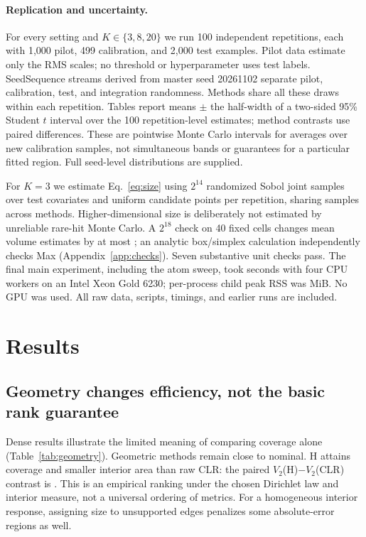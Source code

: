 \documentclass{article}
\begin{document}
\paragraph{Replication and uncertainty.}
For every setting and $K\in\{3,8,20\}$ we run 100 independent repetitions, each with 1,000 pilot, 499 calibration, and 2,000 test examples. Pilot data estimate only the RMS scales; no threshold or hyperparameter uses test labels. SeedSequence streams derived from master seed 20261102 separate pilot, calibration, test, and integration randomness. Methods share all these draws within each repetition. Tables report means $\pm$ the half-width of a two-sided 95\% Student $t$ interval over the 100 repetition-level estimates; method contrasts use paired differences. These are pointwise Monte Carlo intervals for averages over new calibration samples, not simultaneous bands or guarantees for a particular fitted region. Full seed-level distributions are supplied.

For $K=3$ we estimate Eq.~\eqref{eq:size} using $2^{14}$ randomized Sobol joint samples over test covariates and uniform candidate points per repetition, sharing samples across methods. Higher-dimensional size is deliberately not estimated by unreliable rare-hit Monte Carlo. A $2^{18}$ check on 40 fixed cells changes mean volume estimates by at most \MaxIntegrationMeanDiff; an analytic box/simplex calculation independently checks Max (Appendix~\ref{app:checks}). Seven substantive unit checks pass. The final main experiment, including the atom sweep, took \MainSeconds{} seconds with four CPU workers on an Intel Xeon Gold 6230; per-process child peak RSS was \PeakRSS{} MiB. No GPU was used. All raw data, scripts, timings, and earlier runs are included.

\section{Results}
\label{sec:results}
\subsection{Geometry changes efficiency, not the basic rank guarantee}
\begin{table}[t]
\caption{Observed joint coverage and normalized size for $K=3$. Means $\pm$ 95\% interval half-width across 100 repetitions. $V_2$ measures interior area and $V_1$ measures edge length. H-Z and H-GZ are exploratory response-stratified controls. A displayed zero is rounded, not a claim of exact zero.}
\label{tab:geometry}\centering\small\setlength{\tabcolsep}{3pt}

\end{table}
Dense results illustrate the limited meaning of comparing coverage alone (Table~\ref{tab:geometry}). Geometric methods remain close to nominal. H attains coverage \DenseH{} and smaller interior area than raw CLR: the paired $V_2$(H)$-V_2$(CLR) contrast is \ContrastA. This is an empirical ranking under the chosen Dirichlet law and interior measure, not a universal ordering of metrics. For a homogeneous interior response, assigning size to unsupported edges penalizes some absolute-error regions as well.
\end{document}
